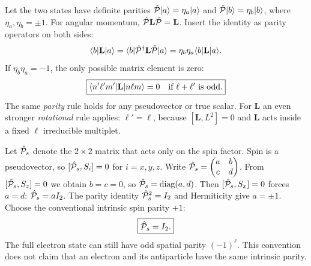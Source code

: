 Let the two states have definite parities
$\hat{\mathcal P}\lvert a\rangle=\eta_a\lvert a\rangle$ and
$\hat{\mathcal P}\lvert b\rangle=\eta_b\lvert b\rangle$, where
$\eta_a,\eta_b=\pm1$.
For angular momentum, $\hat{\mathcal P}\mathbf L\hat{\mathcal P}=\mathbf L$.
Insert the identity as parity operators
on both sides:
\[
\langle b\rvert\mathbf L\lvert a\rangle=
\langle b\rvert\hat{\mathcal P}^\dagger\mathbf L\hat{\mathcal P}\lvert a\rangle
=\eta_b\eta_a\langle b\rvert\mathbf L\lvert a\rangle.
\]
If $\eta_b\eta_a=-1$, the only possible
matrix element is zero:
\begin{equation}
\boxed{\langle n'\ell'm'\rvert\mathbf L\lvert n\ell m\rangle=0
\quad\text{if }\ell+\ell'\text{ is odd}.}
\end{equation}
The same \emph{parity} rule holds for
any pseudovector or true scalar.
For $\mathbf L$ an even stronger
\emph{rotational} rule applies:
$\ell'=\ell$, because
$[\mathbf L,L^2]=0$ and $\mathbf L$
acts inside a fixed $\ell$ irreducible
multiplet.

Let $\hat{\mathcal P}_s$ denote the $2\times2$ matrix
that acts only on the spin factor.
Spin is a pseudovector, so
$[\hat{\mathcal P}_s,S_i]=0$ for $i=x,y,z$.
Write
$\hat{\mathcal P}_s=\begin{pmatrix}a&b\\c&d\end{pmatrix}$.
From $[\hat{\mathcal P}_s,S_z]=0$ we obtain
$b=c=0$, so $\hat{\mathcal P}_s=\mathrm{diag}(a,d)$.
Then $[\hat{\mathcal P}_s,S_x]=0$ forces $a=d$:
$\hat{\mathcal P}_s=aI_2$.
The parity identity $\hat{\mathcal P}_s^2=I_2$
and Hermiticity give $a=\pm1$.
Choose the conventional intrinsic
spin parity $+1$:
\begin{equation}
\boxed{\hat{\mathcal P}_s=I_2.}
\end{equation}
The full electron state can still have
odd spatial parity $(-1)^\ell$.
This convention does not claim that an
electron and its antiparticle have the
same intrinsic parity.

